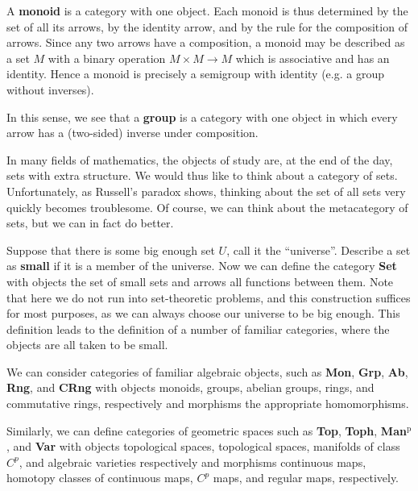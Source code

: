 \documentclass{../../mathnotes}
\begin{document}
\begin{exmp}
    A \textbf{monoid} is a category with one object. Each monoid is thus determined by the set of all its arrows, by
    the identity arrow, and by the rule for the composition of arrows. Since any two arrows have a composition,
    a monoid may be described as a set $M$ with a binary operation $M\times M\to M$ which is associative and has
    an identity. Hence a monoid is precisely a semigroup with identity (e.g. a group without inverses).

    In this sense, we see that a \textbf{group} is a category with one object in which every arrow has a
    (two-sided) inverse under composition.
\end{exmp}

In many fields of mathematics, the objects of study are, at the end of the day, sets with extra structure.
We would thus like to think about a category of sets. Unfortunately, as Russell's paradox shows, thinking about
the set of all sets very quickly becomes troublesome. Of course, we can think about the metacategory of sets,
but we can in fact do better.

Suppose that there is some big enough set $U$, call it the ``universe''. Describe a set as \textbf{small} if it
is a member of the universe. Now we can define the category \textbf{Set} with objects the set of small sets and arrows
all functions between them. Note that here we do not run into set-theoretic problems, and this construction
suffices for most purposes, as we can always choose our universe to be big enough. This definition leads to the definition
of a number of familiar categories, where the objects are all taken to be small.

\begin{exmp}
    We can consider categories of familiar algebraic objects, such as \textbf{Mon}, \textbf{Grp}, \textbf{Ab},
    \textbf{Rng}, and \textbf{CRng} with objects monoids, groups, abelian groups, rings, and commutative rings,
    respectively and morphisms the appropriate homomorphisms.

    Similarly, we can define categories of geometric spaces such as \textbf{Top}, \textbf{Toph}, \textbf{Man$^\text{p}$},
    and \textbf{Var} with objects topological spaces, topological spaces, manifolds of class $C^p$,
    and algebraic varieties respectively and morphisms continuous maps, homotopy classes of continuous maps, $C^p$ maps,
    and regular maps, respectively.
\end{exmp}
\end{document}

